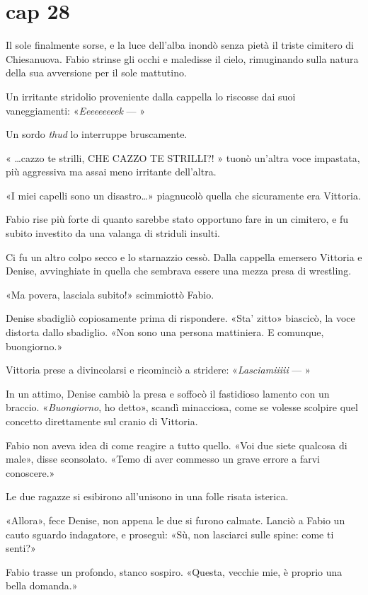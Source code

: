 \chapter{cap 28}

Il sole finalmente sorse, e la luce dell'alba inondò senza pietà il triste cimitero di Chiesanuova. Fabio strinse gli occhi e maledisse il cielo, rimuginando sulla natura della sua avversione per il sole
mattutino.

Un irritante stridolio proveniente dalla cappella lo riscosse dai suoi vaneggiamenti: «\emph{Eeeeeeeeek} --- »

Un sordo \emph{thud} lo interruppe bruscamente.

« \ldots{}cazzo te strilli, CHE CAZZO TE STRILLI?! » tuonò un'altra voce impastata, più aggressiva ma assai meno irritante dell'altra.

«I miei capelli sono un disastro\ldots{}» piagnucolò quella che sicuramente era Vittoria.

Fabio rise più forte di quanto sarebbe stato opportuno fare in un cimitero, e fu subito investito da una valanga di striduli insulti.

Ci fu un altro colpo secco e lo starnazzio cessò. Dalla cappella emersero Vittoria e Denise, avvinghiate in quella che sembrava essere una mezza presa di wrestling.

«Ma povera, lasciala subito!» scimmiottò Fabio.

Denise sbadigliò copiosamente prima di rispondere. «Sta' zitto» biascicò, la voce distorta dallo sbadiglio. «Non sono una persona mattiniera. E comunque, buongiorno.»

Vittoria prese a divincolarsi e ricominciò a stridere: «\emph{Lasciamiiiii} --- »

In un attimo, Denise cambiò la presa e soffocò il fastidioso lamento con un braccio. «\emph{Buongiorno}, ho detto», scandì minacciosa, come se volesse scolpire quel concetto direttamente sul cranio di Vittoria.

Fabio non aveva idea di come reagire a tutto quello. «Voi due siete qualcosa di male», disse sconsolato. «Temo di aver commesso un grave errore a farvi conoscere.»

Le due ragazze si esibirono all'unisono in una folle risata isterica.

«Allora», fece Denise, non appena le due si furono calmate. Lanciò a Fabio un cauto sguardo indagatore, e proseguì: «Sù, non lasciarci sulle spine: come ti senti?»

Fabio trasse un profondo, stanco sospiro. «Questa, vecchie mie, è proprio una bella domanda.»

